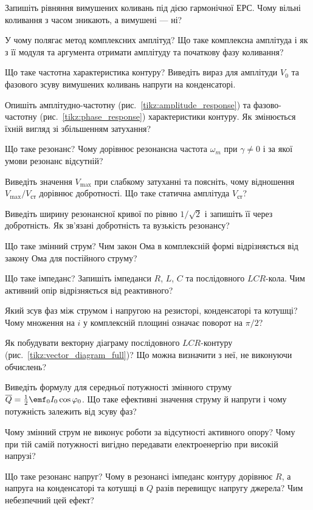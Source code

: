 \begin{Questions}
\begin{quizlist}
	\item Запишіть рівняння вимушених коливань під дією гармонічної ЕРС. Чому вільні коливання з часом зникають, а вимушені --- ні?
	\item У чому полягає метод комплексних амплітуд? Що таке комплексна амплітуда і як з її модуля та аргумента отримати амплітуду та початкову фазу коливання?
	\item Що таке частотна характеристика контуру? Виведіть вираз для амплітуди $V_0$ та фазового зсуву вимушених коливань напруги на конденсаторі.
	\item Опишіть амплітудно-частотну (рис.~\ref{tikz:amplitude_response}) та фазово-частотну (рис.~\ref{tikz:phase_response}) характеристики контуру. Як змінюється їхній вигляд зі збільшенням затухання?
	\item Що таке резонанс? Чому дорівнює резонансна частота $\omega_m$ при $\gamma\ne0$ і за якої умови резонанс відсутній?
	\item Виведіть значення $V_{\max}$ при слабкому затуханні та поясніть, чому відношення $V_{\max}/V_{\text{ст}}$ дорівнює добротності. Що таке статична амплітуда $V_{\text{ст}}$?
	\item Виведіть ширину резонансної кривої по рівню $1/\sqrt2$ і запишіть її через добротність. Як зв'язані добротність та вузькість резонансу?
	\item Що таке змінний струм? Чим закон Ома в комплексній формі відрізняється від закону Ома для постійного струму?
	\item Що таке імпеданс? Запишіть імпеданси $R$, $L$, $C$ та послідовного $LCR$-кола. Чим активний опір відрізняється від реактивного?
	\item Який зсув фаз між струмом і напругою на резисторі, конденсаторі та котушці? Чому множення на $i$ у комплексній площині означає поворот на $\pi/2$?
	\item Як побудувати векторну діаграму послідовного $LCR$-контуру (рис.~\ref{tikz:vector_diagram_full})? Що можна визначити з неї, не виконуючи обчислень?
	\item Виведіть формулу для середньої потужності змінного струму $\overline Q = \frac12\emf_0I_0\cos\varphi_0$. Що таке ефективні значення струму й напруги і чому потужність залежить від зсуву фаз?
	\item Чому змінний струм не виконує роботи за відсутності активного опору? Чому при тій самій потужності вигідно передавати електроенергію при високій напрузі?
	\item Що таке резонанс напруг? Чому в резонансі імпеданс контуру дорівнює $R$, а напруга на конденсаторі та котушці в $Q$ разів перевищує напругу джерела? Чим небезпечний цей ефект?

\end{quizlist}
\end{Questions}
